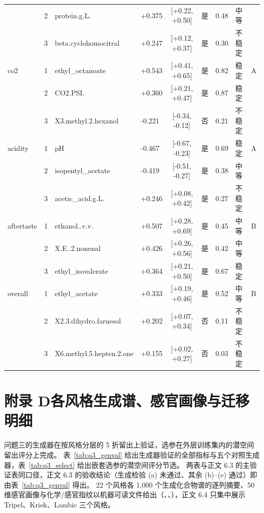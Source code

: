 {\begin{longtable}{llllcccll}
 & 2 & protein.g.L. & +0.375 & [+0.22, +0.50] & 是 & 0.48 & 中等 &  \\
 & 3 & beta.cyclohomocitral & +0.247 & [+0.12, +0.37] & 是 & 0.30 & 不稳定 &  \\
co2 & 1 & ethyl\_octanoate & +0.543 & [+0.41, +0.65] & 是 & 0.82 & 稳定 & A \\
 & 2 & CO2.PSI. & +0.360 & [+0.21, +0.47] & 是 & 0.87 & 稳定 &  \\
 & 3 & X3.methyl.2.hexanol & -0.221 & [-0.34, -0.12] & 否 & 0.21 & 不稳定 &  \\
acidity & 1 & pH & -0.467 & [-0.67, -0.23] & 是 & 0.69 & 稳定 & A \\
 & 2 & isopentyl\_acetate & -0.419 & [-0.51, -0.27] & 是 & 0.38 & 中等 &  \\
 & 3 & acetic\_acid.g.L. & +0.246 & [+0.08, +0.42] & 是 & 0.27 & 不稳定 &  \\
aftertaste & 1 & ethanol..v.v. & +0.507 & [+0.28, +0.69] & 是 & 0.45 & 中等 & B \\
 & 2 & X.E..2.nonenal & +0.426 & [+0.26, +0.56] & 是 & 0.42 & 中等 &  \\
 & 3 & ethyl\_isovalerate & +0.364 & [+0.21, +0.50] & 是 & 0.67 & 稳定 &  \\
overall & 1 & ethyl\_acetate & +0.333 & [+0.19, +0.46] & 是 & 0.52 & 中等 & B \\
 & 2 & X2.3.dihydro.farnesol & +0.202 & [+0.07, +0.34] & 否 & 0.11 & 不稳定 &  \\
 & 3 & X6.methyl.5.hepten.2.one & +0.155 & [+0.02, +0.27] & 否 & 0.03 & 不稳定 &  \\
\end{longtable}
}

\section*{附录 D\quad 各风格生成谱、感官画像与迁移明细}

问题三的生成器在按风格分层的 5 折留出上验证，选参在外层训练集内的潜空间留出评分上完成。
表~\ref{tab:q3_genval} 给出生成器验证的全部指标与五个对照生成器，表~\ref{tab:q3_select} 给出嵌套选参的潜空间评分节选。
两表与正文 6.3 的主验证表同口径，正文 6.3 的验收结论（生成检验 (a) 未通过、其余 (b)--(e) 通过）即由表~\ref{tab:q3_genval} 得出。
22 个风格各 1{,}000 个生成化合物谱的逐列摘要、50 维感官画像与化学/感官指纹以机器可读文件给出（、、），正文 6.4 只集中展示 Tripel、Kriek、Lambic 三个风格。

